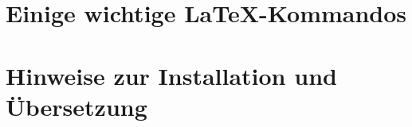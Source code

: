 %

 












%
%




% 
%
\seAppendix{}
\chapter{Einige wichtige \LaTeX{}-Kommandos}











\chapter{Hinweise zur Installation und \"Ubersetzung}



%
%
%
%
\newpage
\sePrintGlossary{}


%
%
\sePrintBibliography{}




%
%


%
%
%


